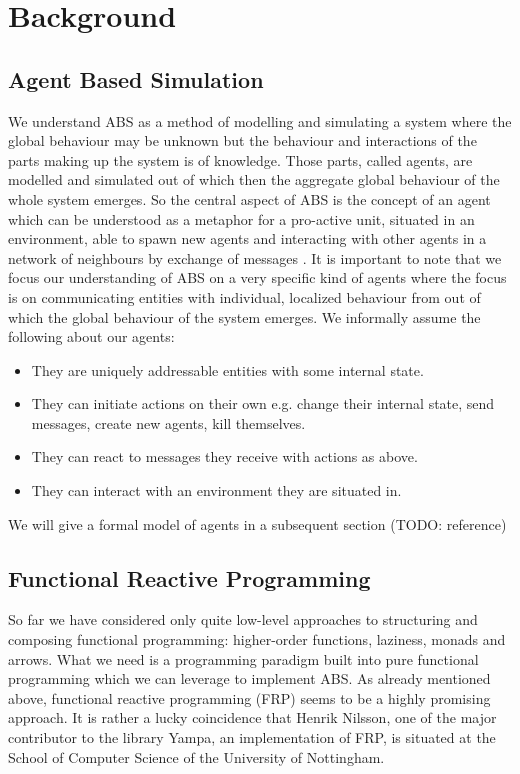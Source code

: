 \section{Background}

\subsection{Agent Based Simulation}
We understand ABS as a method of modelling and simulating a system where the global behaviour may be unknown but the behaviour and interactions of the parts making up the system is of knowledge. Those parts, called agents, are modelled and simulated out of which then the aggregate global behaviour of the whole system emerges. So the central aspect of ABS is the concept of an agent which can be understood as a metaphor for a pro-active unit, situated in an environment, able to spawn new agents and interacting with other agents in a network of neighbours by exchange of messages \cite{wooldridge_introduction_2009}. It is important to note that we focus our understanding of ABS on a very specific kind of agents where the focus is on communicating entities with individual, localized behaviour from out of which the global behaviour of the system emerges. We informally assume the following about our agents:

\begin{itemize}
	\item They are uniquely addressable entities with some internal state.
	\item They can initiate actions on their own e.g. change their internal state, send messages, create new agents, kill themselves.
	\item They can react to messages they receive with actions as above.
	\item They can interact with an environment they are situated in.
\end{itemize} 

We will give a formal model of agents in a subsequent section (TODO: reference)

\subsection{Functional Reactive Programming}
So far we have considered only quite low-level approaches to structuring and composing functional programming: higher-order functions, laziness, monads and arrows. What we need is a programming paradigm built into pure functional programming which we can leverage to implement ABS. As already mentioned above, functional reactive programming (FRP) seems to be a highly promising approach. It is rather a lucky coincidence that Henrik Nilsson, one of the major contributor to the library Yampa, an implementation of FRP, is situated at the School of Computer Science of the University of Nottingham.

